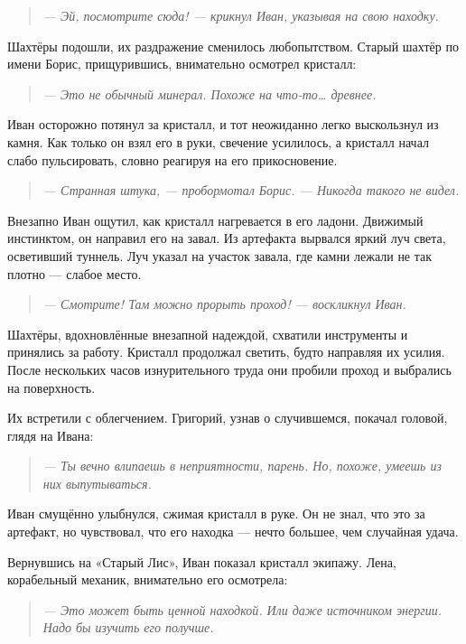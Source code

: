 \documentclass[12pt,a4paper]{book}
\newenvironment{dialogue}{\begin{quote}\itshape}{\end{quote}}
\begin{document}
\begin{dialogue}
--- Эй, посмотрите сюда! --- крикнул Иван, указывая на свою находку.
\end{dialogue}

Шахтёры подошли, их раздражение сменилось любопытством. Старый шахтёр по имени Борис, прищурившись, внимательно осмотрел кристалл:

\begin{dialogue}
--- Это не обычный минерал. Похоже на что-то… древнее.
\end{dialogue}

Иван осторожно потянул за кристалл, и тот неожиданно легко выскользнул из камня. Как только он взял его в руки, свечение усилилось, а кристалл начал слабо пульсировать, словно реагируя на его прикосновение.

\begin{dialogue}
--- Странная штука, --- пробормотал Борис. --- Никогда такого не видел.
\end{dialogue}

Внезапно Иван ощутил, как кристалл нагревается в его ладони. Движимый инстинктом, он направил его на завал. Из артефакта вырвался яркий луч света, осветивший туннель. Луч указал на участок завала, где камни лежали не так плотно --- слабое место.

\begin{dialogue}
--- Смотрите! Там можно прорыть проход! --- воскликнул Иван.
\end{dialogue}

Шахтёры, вдохновлённые внезапной надеждой, схватили инструменты и принялись за работу. Кристалл продолжал светить, будто направляя их усилия. После нескольких часов изнурительного труда они пробили проход и выбрались на поверхность.

Их встретили с облегчением. Григорий, узнав о случившемся, покачал головой, глядя на Ивана:

\begin{dialogue}
--- Ты вечно влипаешь в неприятности, парень. Но, похоже, умеешь из них выпутываться.
\end{dialogue}

Иван смущённо улыбнулся, сжимая кристалл в руке. Он не знал, что это за артефакт, но чувствовал, что его находка --- нечто большее, чем случайная удача.

Вернувшись на «Старый Лис», Иван показал кристалл экипажу. Лена, корабельный механик, внимательно его осмотрела:

\begin{dialogue}
--- Это может быть ценной находкой. Или даже источником энергии. Надо бы изучить его получше.
\end{dialogue}
\end{document}
